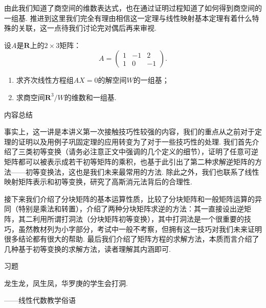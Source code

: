 由此我们知道了商空间的维数表达式，也在通过证明过程知道了如何得到商空间的一组基. 推进到这里我们完全有理由相信这一定理与线性映射基本定理有着什么特殊的关联，这一点待我们讨论完对偶后再来审视.

\begin{example}{}{}
    设$A$是$\mathbf{R}$上的$2\times 3$矩阵：
    \[A=\begin{pmatrix}
            1 & -1 & 2 \\ 1 & 0 & -1
        \end{pmatrix}.\]
    \begin{enumerate}
        \item 求齐次线性方程组$AX=0$的解空间$W$的一组基；

        \item 求商空间$\mathbf{R}^3/W$的维数和一组基.
    \end{enumerate}
\end{example}

\begin{solution}

\end{solution}

\vspace{2ex}
\centerline{\heiti \Large 内容总结}

事实上，这一讲是本讲义第一次接触技巧性较强的内容，我们的重点从之前对于定理的证明以及用例子巩固定理的应用转变为了对于一些技巧性的处理. 我们首先介绍了三类初等变换（请务必注意正文中强调的几个定义的细节），证明了任意可逆矩阵都可以被表示成若干初等矩阵的乘积，也基于此引出了第二种求解逆矩阵的方法——初等变换法，这也是我们未来最常用的方法. 除此之外，我们也联系了线性映射矩阵表示和初等变换，研究了高斯消元法背后的合理性.

接下来我们介绍了分块矩阵的基本运算性质，比较了分块矩阵和一般矩阵运算的异同（特别是乘法和转置），介绍了两种分块矩阵求逆的方法：其一直接设出逆矩阵，其二利用所谓打洞法（分块矩阵初等变换），其中打洞法是一个很重要的技巧，虽然教材列为小字部分，考试中一般不考察，但拥有这一技巧对我们未来证明很多结论都有很大的帮助. 最后我们介绍了矩阵方程的求解方法，本质而言介绍了几种基于初等变换的求解方法，读者理解其内涵即可.

\vspace{2ex}
\centerline{\heiti \Large 习题}

\vspace{2ex}
{\kaishu 龙生龙，凤生凤，华罗庚的学生会打洞.}
\begin{flushright}
    \kaishu
    ——线性代数教学俗语
\end{flushright}

